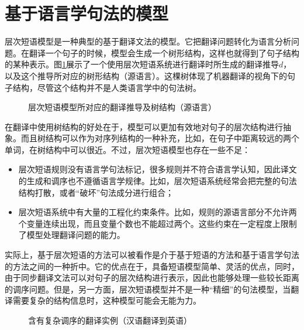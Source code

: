 \sectionnewpage
\section{基于语言学句法的模型}\label{section-4.4}

\parinterval 层次短语模型是一种典型的基于翻译文法的模型。它把翻译问题转化为语言分析问题。在翻译一个句子的时候，模型会生成一个树形结构，这样也就得到了句子结构的某种表示。图\ref{fig:4-41}展示了一个使用层次短语系统进行翻译时所生成的翻译推导$d$，以及这个推导所对应的树形结构（源语言）。这棵树体现了机器翻译的视角下的句子结构，尽管这个结构并不是人类语言学中的句法树。

\begin{figure}[htp]
\centering

\setlength{\belowcaptionskip}{-0.5em}
\caption{层次短语模型所对应的翻译推导及树结构（源语言）}
\label{fig:4-41}
\end{figure}

\parinterval 在翻译中使用树结构的好处在于，模型可以更加有效地对句子的层次结构进行抽象。而且树结构可以作为对序列结构的一种补充，比如，在句子中距离较远的两个单词，在树结构中可以很近。不过，层次短语模型也存在一些不足：

\begin{itemize}
\vspace{0.5em}
\item 层次短语规则没有语言学句法标记，很多规则并不符合语言学认知，因此译文的生成和调序也不遵循语言学规律。比如，层次短语系统经常会把完整的句法结构打散，或者``破坏''句法成分进行组合；
\vspace{0.5em}
\item 层次短语系统中有大量的工程化约束条件。比如，规则的源语言部分不允许两个变量连续出现，而且变量个数也不能超过两个。这些约束在一定程度上限制了模型处理翻译问题的能力。
\vspace{0.5em}
\end{itemize}

\parinterval 实际上，基于层次短语的方法可以被看作是介于基于短语的方法和基于语言学句法的方法之间的一种折中。它的优点在于，具备短语模型简单、灵活的优点，同时，由于同步翻译文法可以对句子的层次结构进行表示，因此也能够处理一些较长距离的调序问题。但是，另一方面，层次短语模型并不是一种``精细''的句法模型，当翻译需要复杂的结构信息时，这种模型可能会无能为力。

\begin{figure}[htp]
\centering

\setlength{\belowcaptionskip}{-0.5em}
\caption{含有复杂调序的翻译实例（汉语翻译到英语）}
\label{fig:4-42}
\end{figure}


